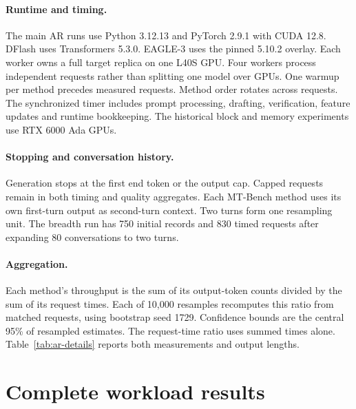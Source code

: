 \documentclass{article}
\begin{document}
\paragraph{Runtime and timing.}
The main AR runs use Python 3.12.13 and PyTorch 2.9.1 with CUDA 12.8.
DFlash uses Transformers 5.3.0. EAGLE-3 uses the pinned 5.10.2 overlay.
Each worker owns a full target replica on one L40S GPU. Four workers
process independent requests rather than splitting one model over GPUs.
One warmup per method precedes measured requests. Method order rotates
across requests. The synchronized timer includes prompt processing,
drafting, verification, feature updates and runtime bookkeeping.
The historical block and memory experiments use RTX 6000 Ada GPUs.

\paragraph{Stopping and conversation history.}
Generation stops at the first end token or the output cap. Capped requests
remain in both timing and quality aggregates. Each MT-Bench method uses
its own first-turn output as second-turn context. Two turns form one
resampling unit. The breadth run has 750 initial records and 830 timed
requests after expanding 80 conversations to two turns.

\paragraph{Aggregation.}
Each method's throughput is the sum of its output-token counts divided
by the sum of its request times. Each of 10,000 resamples recomputes this
ratio from matched requests, using bootstrap seed 1729. Confidence bounds
are the central 95\% of resampled estimates. The request-time ratio uses
summed times alone. Table~\ref{tab:ar-details} reports both measurements
and output lengths.

\begin{table}[H]
\caption{Additional MATH-500 measurements. A is AR, S is source reuse and
R is RelaySpec. Time ratio divides summed AR time by summed relay time.}
\label{tab:ar-details}
\centering\small
\setlength{\tabcolsep}{4pt}

\end{table}

\section{Complete workload results}
\label{app:breadth}
\end{document}
